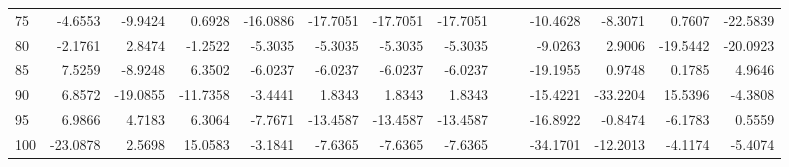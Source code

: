 \begin{tabular}{lrrrrrrrrrrrrr}
75  &         -4.6553 &      -9.9424 &      0.6928 &       -16.0886 &      -17.7051 &      -17.7051 &      -17.7051 &               &               &  -10.4628 &     -8.3071 &     0.7607 &      -22.5839 \\
80  &         -2.1761 &       2.8474 &     -1.2522 &        -5.3035 &       -5.3035 &       -5.3035 &       -5.3035 &               &               &   -9.0263 &      2.9006 &   -19.5442 &      -20.0923 \\
85  &          7.5259 &      -8.9248 &      6.3502 &        -6.0237 &       -6.0237 &       -6.0237 &       -6.0237 &               &               &  -19.1955 &      0.9748 &     0.1785 &        4.9646 \\
90  &          6.8572 &     -19.0855 &    -11.7358 &        -3.4441 &        1.8343 &        1.8343 &        1.8343 &               &               &  -15.4221 &    -33.2204 &    15.5396 &       -4.3808 \\
95  &          6.9866 &       4.7183 &      6.3064 &        -7.7671 &      -13.4587 &      -13.4587 &      -13.4587 &               &               &  -16.8922 &     -0.8474 &    -6.1783 &        0.5559 \\
100 &        -23.0878 &       2.5698 &     15.0583 &        -3.1841 &       -7.6365 &       -7.6365 &       -7.6365 &               &               &  -34.1701 &    -12.2013 &    -4.1174 &       -5.4074 \\
\bottomrule
\end{tabular}
